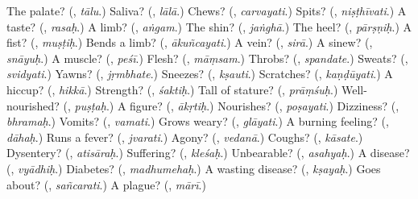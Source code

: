 \begin{tcolorbox}[breakable,colback=teal!4,colframe=teal!35!black,title={Before you move on}]
The palate? (\textbf{}, \emph{tālu}.) Saliva? (\textbf{}, \emph{lālā}.) Chews? (\textbf{}, \emph{carvayati}.) Spits? (\textbf{}, \emph{niṣṭhīvati}.) A taste? (\textbf{}, \emph{rasaḥ}.) A limb? (\textbf{}, \emph{aṅgam}.) The shin? (\textbf{}, \emph{jaṅghā}.) The heel? (\textbf{}, \emph{pārṣṇiḥ}.) A fist? (\textbf{}, \emph{muṣṭiḥ}.) Bends a limb? (\textbf{}, \emph{ākuñcayati}.) A vein? (\textbf{}, \emph{sirā}.) A sinew? (\textbf{}, \emph{snāyuḥ}.) A muscle? (\textbf{}, \emph{peśī}.) Flesh? (\textbf{}, \emph{māṃsam}.) Throbs? (\textbf{}, \emph{spandate}.) Sweats? (\textbf{}, \emph{svidyati}.) Yawns? (\textbf{}, \emph{jṛmbhate}.) Sneezes? (\textbf{}, \emph{kṣauti}.) Scratches? (\textbf{}, \emph{kaṇḍūyati}.) A hiccup? (\textbf{}, \emph{hikkā}.) Strength? (\textbf{}, \emph{śaktiḥ}.) Tall of stature? (\textbf{}, \emph{prāṃśuḥ}.) Well-nourished? (\textbf{}, \emph{puṣṭaḥ}.) A figure? (\textbf{}, \emph{ākṛtiḥ}.) Nourishes? (\textbf{}, \emph{poṣayati}.) Dizziness? (\textbf{}, \emph{bhramaḥ}.) Vomits? (\textbf{}, \emph{vamati}.) Grows weary? (\textbf{}, \emph{glāyati}.) A burning feeling? (\textbf{}, \emph{dāhaḥ}.) Runs a fever? (\textbf{}, \emph{jvarati}.) Agony? (\textbf{}, \emph{vedanā}.) Coughs? (\textbf{}, \emph{kāsate}.) Dysentery? (\textbf{}, \emph{atisāraḥ}.) Suffering? (\textbf{}, \emph{kleśaḥ}.) Unbearable? (\textbf{}, \emph{asahyaḥ}.) A disease? (\textbf{}, \emph{vyādhiḥ}.) Diabetes? (\textbf{}, \emph{madhumehaḥ}.) A wasting disease? (\textbf{}, \emph{kṣayaḥ}.) Goes about? (\textbf{}, \emph{sañcarati}.) A plague? (\textbf{}, \emph{mārī}.)
\end{tcolorbox}
